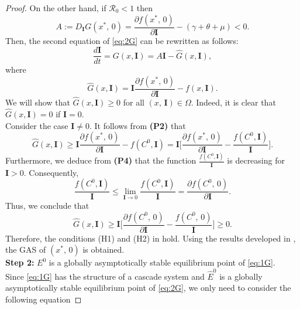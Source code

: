 \documentclass[11pt]{article}
\theoremstyle{definition}
\theoremstyle{remark}
\numberwithin{equation}{section}
\begin{document}
\begin{proof}
On the other hand, if $\mathcal{R}_0 < 1$ then
\begin{equation*}
A := D_{\textbf{I}}G(x^*,\,0) = \dfrac{\partial f(x^*,\,0)}{\partial \textbf{I}} - (\gamma + \theta + \mu) < 0.
\end{equation*}
Then, the second equation of \eqref{eq:2G} can be rewritten as follows:
\begin{equation*}
\dfrac{d\textbf{I}}{dt} = G(x, \textbf{I}) = A\textbf{I} - \widehat{G}(x, \textbf{I}),
\end{equation*}
where 
\begin{equation*}
\widehat{G}(x, \textbf{I}) = \textbf{I}\dfrac{\partial f(x^*,\,0)}{\partial \textbf{I}} - f(x,\textbf{I}).
\end{equation*}
We will show that $\widehat{G}(x, \textbf{I}) \ge 0$ for all $(x,\,\textbf{I}) \in \Omega$. Indeed, it is clear that $\widehat{G}(x, \textbf{I}) = 0$ if $\textbf{I} = 0$.\\
%
Consider the case $\textbf{I} \ne 0$. It follows from \textbf{(P2)} that 
\begin{equation*}
\widehat{G}(x, \textbf{I}) \ge  \textbf{I}\dfrac{\partial f(x^*,\,0)}{\partial \textbf{I}} - f(C^0,\textbf{I}) =  \textbf{I}\bigg[\dfrac{\partial f(x^*,\,0)}{\partial \textbf{I}} - \dfrac{f(C^0,\textbf{I})}{\textbf{I}}\bigg].
\end{equation*}
Furthermore, we deduce from \textbf{(P4)} that the function  $\frac{f(C^0,\textbf{I})}{\textbf{I}}$ is decreasing for $\textbf{I} > 0$. Consequently,
\begin{equation*}
\dfrac{f(C^0,\textbf{I})}{\textbf{I}} \le \lim_{\textbf{I} \to 0}\dfrac{f(C^0,\textbf{I})}{\textbf{I}} = \dfrac{\partial f(C^0,\,0)}{\partial \textbf{I}}.
\end{equation*}
Thus, we conclude that
\begin{equation*}
\widehat{G}(x, \textbf{I}) \ge \textbf{I}\bigg[\dfrac{\partial f(C^0,\,0)}{\partial \textbf{I}} - \dfrac{f(C^0,\,0)}{\textbf{I}}\bigg]  \ge 0.
\end{equation*}
Therefore, the conditions (H1) and (H2) in \cite{Castillo-Chavez} hold. 
Using the results developed in \cite{Castillo-Chavez}, the GAS of $(x^*,\,0)$ is obtained. \\
\textbf{Step 2:} $E^0$ is a globally asymptotically stable equilibrium point of \eqref{eq:1G}.\\
Since \eqref{eq:1G} has the structure of a cascade system and $\widehat{E}^0$ is a globally asymptotically stable equilibrium point of \eqref{eq:2G}, we only need to consider the following equation

\end{proof}
\end{document}
